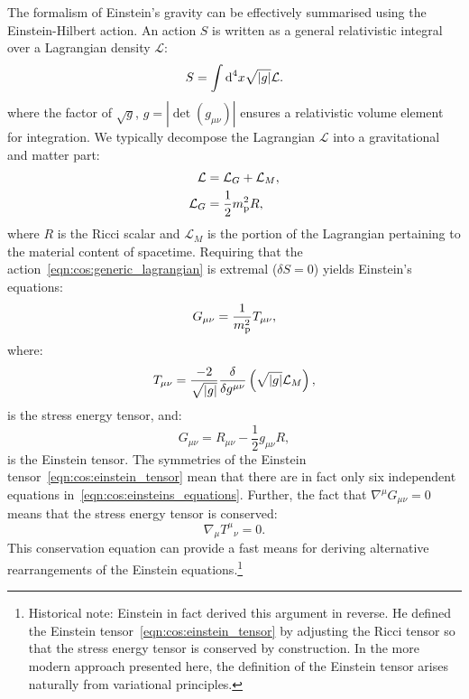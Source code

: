 The formalism of Einstein's gravity can be effectively summarised using the Einstein-Hilbert action. An action \(S\) is written as a general relativistic integral over a Lagrangian density \(\mathcal{L}\):
\begin{equation}
  S = \int\d[4]{x} \sqrt{|g|} \mathcal{L}.
  \label{eqn:cos:generic_lagrangian}
\end{equation}
where the factor of \(\sqrt{g}\), \(g=\left|\det\left( g_{\mu\nu} \right)\right|\) ensures a relativistic volume element for integration.
We typically decompose the Lagrangian \(\mathcal{L}\) into a gravitational and matter part:
\begin{align}
  \mathcal{L} &= \mathcal{L}_G + \mathcal{L}_M,
  \label{eqn:cos:decomp}\\
  \mathcal{L}_G &= \frac{1}{2} \m^2 R,
  \label{eqn:cos:L_grav}
\end{align}
where \(R\) is the Ricci scalar and \(\mathcal{L}_M\) is the portion of the Lagrangian pertaining to the material content of spacetime. Requiring that the action~\eqref{eqn:cos:generic_lagrangian} is extremal (\(\delta S = 0\)) yields Einstein's equations:
\begin{equation}
  G_{\mu\nu} = \frac{1}{\m^2}T_{\mu\nu},
  \label{eqn:cos:einsteins_equations}
\end{equation}
where:
\begin{equation}
  T_{\mu\nu} = \frac{-2}{\sqrt{\abs{g}}}\frac{\delta}{\delta g^{\mu\nu}}\left( \sqrt{\abs{g}} \mathcal{L}_M \right),
  \label{eqn:cos:SET_fundamantal}
\end{equation}
is the stress energy tensor, and:
\begin{equation}
  G_{\mu\nu} = R_{\mu\nu} - \frac{1}{2}g_{\mu\nu} R,
  \label{eqn:cos:einstein_tensor}
\end{equation}
is the Einstein tensor. The symmetries of the Einstein tensor~\eqref{eqn:cos:einstein_tensor} mean that there are in fact only six independent equations in~\eqref{eqn:cos:einsteins_equations}. Further, the fact that \(\nabla^\mu G_{\mu\nu}=0\) means that the stress energy tensor is conserved:
\begin{equation}
  \nabla_\mu {T^{\mu}}_{\nu} = 0.
  \label{eqn:cos:SET_conservation}
\end{equation}
This conservation equation can provide a fast means for deriving alternative rearrangements of the Einstein equations.\footnote{Historical note: Einstein in fact derived this argument in reverse. He defined the Einstein tensor~\protect\eqref{eqn:cos:einstein_tensor} by adjusting the Ricci tensor so that the stress energy tensor is conserved by construction. In the more modern approach presented here, the definition of the Einstein tensor arises naturally from variational principles.}

